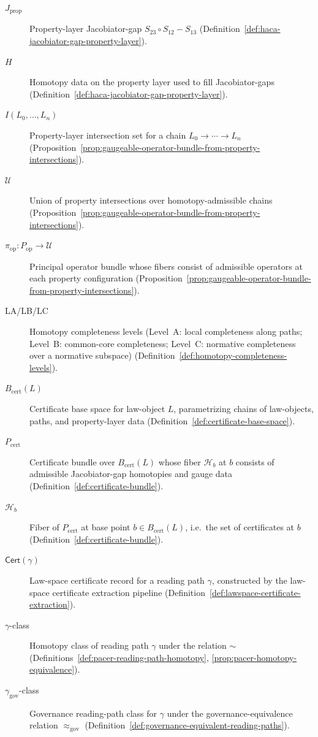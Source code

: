 \documentclass[11pt]{book}
\theoremstyle{plain}
\theoremstyle{definition}
\theoremstyle{remark}
\begin{document}
\begin{description}
  \item[$J_{\mathrm{prop}}$] Property-layer Jacobiator-gap
        $S_{23}\circ S_{12}-S_{13}$
        (Definition~\ref{def:haca-jacobiator-gap-property-layer}).
  \item[$H$] Homotopy data on the property layer used to fill
        Jacobiator-gaps (Definition~\ref{def:haca-jacobiator-gap-property-layer}).
  \item[$I(L_0,\dots,L_n)$] Property-layer intersection set for a
        chain $L_0\to\cdots\to L_n$ (Proposition~\ref{prop:gaugeable-operator-bundle-from-property-intersections}).
  \item[$\mathcal{U}$] Union of property intersections over
        homotopy-admissible chains (Proposition~\ref{prop:gaugeable-operator-bundle-from-property-intersections}).
  \item[$\pi_{\mathrm{op}}:P_{\mathrm{op}}\to\mathcal{U}$] Principal
        operator bundle whose fibers consist of admissible operators at
        each property configuration
        (Proposition~\ref{prop:gaugeable-operator-bundle-from-property-intersections}).
  \item[LA/LB/LC] Homotopy completeness levels (Level~A: local
        completeness along paths; Level~B: common-core completeness;
        Level~C: normative completeness over a normative subspace)
        (Definition~\ref{def:homotopy-completeness-levels}).
  \item[$B_{\mathrm{cert}}(L)$] Certificate base space for law-object
        $L$, parametrizing chains of law-objects, paths, and
        property-layer data
        (Definition~\ref{def:certificate-base-space}).
  \item[$P_{\mathrm{cert}}$] Certificate bundle over
        $B_{\mathrm{cert}}(L)$ whose fiber $\mathcal{H}_b$ at $b$
        consists of admissible Jacobiator-gap homotopies and gauge
        data (Definition~\ref{def:certificate-bundle}).
  \item[$\mathcal{H}_b$] Fiber of $P_{\mathrm{cert}}$ at base point
        $b\in B_{\mathrm{cert}}(L)$, i.e.\ the set of certificates at
        $b$ (Definition~\ref{def:certificate-bundle}).
  \item[$\mathsf{Cert}(\gamma)$] Law-space certificate record for a
        reading path $\gamma$, constructed by the law-space certificate
        extraction pipeline
        (Definition~\ref{def:lawspace-certificate-extraction}).
  \item[$\gamma$-class] Homotopy class of reading path $\gamma$ under
        the relation $\sim$
        (Definitions~\ref{def:pacer-reading-path-homotopy},
         \ref{prop:pacer-homotopy-equivalence}).
  \item[$\gamma_{\mathrm{gov}}$-class] Governance reading-path class for
        $\gamma$ under the governance-equivalence relation
        $\approx_{\mathrm{gov}}$
        (Definition~\ref{def:governance-equivalent-reading-paths}).
\end{description}
\end{document}
